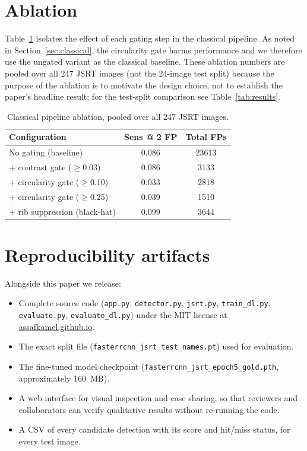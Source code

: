 \documentclass[11pt]{article}
\begin{document}
\section{Ablation}
\label{sec:ablation}

Table~\ref{tab:ablation} isolates the effect of each gating step in the
classical pipeline. As noted in Section~\ref{sec:classical}, the circularity
gate harms performance and we therefore use the ungated variant as the
classical baseline. These ablation numbers are pooled over all 247 JSRT
images (not the 24-image test split) because the purpose of the ablation is
to motivate the design choice, not to establish the paper's headline result;
for the test-split comparison see Table~\ref{tab:results}.

\begin{table}[H]
\centering
\caption{Classical pipeline ablation, pooled over all 247 JSRT images.}
\label{tab:ablation}
\begin{tabular}{lcc}
\toprule
Configuration & Sens @ 2 FP & Total FPs \\
\midrule
No gating (baseline)               & 0.086 & 23613 \\
+ contrast gate ($\geq$0.03)       & 0.086 & 3133 \\
+ circularity gate ($\geq$0.10)    & 0.033 & 2818 \\
+ circularity gate ($\geq$0.25)    & 0.039 & 1510 \\
+ rib suppression (black-hat)       & 0.099 & 3644 \\
\bottomrule
\end{tabular}
\end{table}

\section{Reproducibility artifacts}
\label{sec:tooling}

Alongside this paper we release:

\begin{itemize}
\item Complete source code (\texttt{app.py}, \texttt{detector.py},
\texttt{jsrt.py}, \texttt{train\_dl.py}, \texttt{evaluate.py},
\texttt{evaluate\_dl.py}) under the MIT license at
\url{assafkamel.github.io}.
\item The exact split file (\texttt{fasterrcnn\_jsrt\_test\_names.pt}) used
for evaluation.
\item The fine-tuned model checkpoint
(\texttt{fasterrcnn\_jsrt\_epoch5\_gold.pth}, approximately 160~MB).
\item A web interface for visual inspection and case sharing, so that
reviewers and collaborators can verify qualitative results without
re-running the code.
\item A CSV of every candidate detection with its score and hit/miss status,
for every test image.
\end{itemize}
\end{document}
